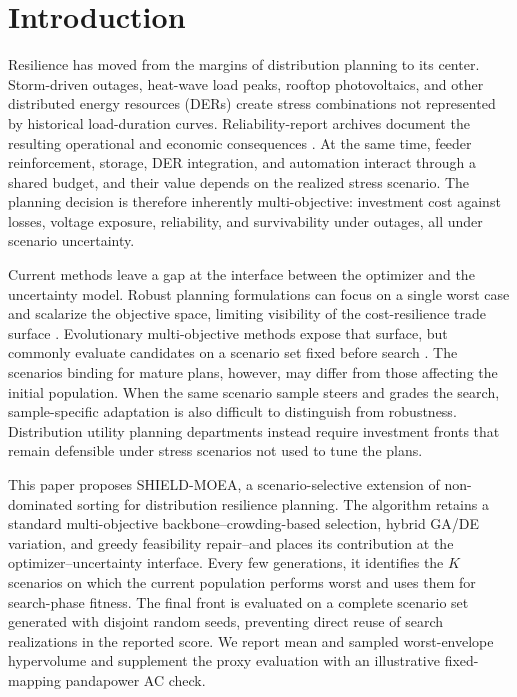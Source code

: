 \documentclass[energies,article,submit,moreauthors]{Definitions/mdpi}
\begin{document}
\section{Introduction}\label{introduction}

Resilience has moved from the margins of distribution planning to its center. Storm-driven outages, heat-wave load peaks, rooftop photovoltaics, and other distributed energy resources (DERs) create stress combinations not represented by historical load-duration curves. Reliability-report archives document the resulting operational and economic consequences \cite{ref1,ref2}. At the same time, feeder reinforcement, storage, DER integration, and automation interact through a shared budget, and their value depends on the realized stress scenario. The planning decision is therefore inherently multi-objective: investment cost against losses, voltage exposure, reliability, and survivability under outages, all under scenario uncertainty.

Current methods leave a gap at the interface between the optimizer and the uncertainty model. Robust planning formulations can focus on a single worst case and scalarize the objective space, limiting visibility of the cost-resilience trade surface \cite{ref3,ref4}. Evolutionary multi-objective methods expose that surface, but commonly evaluate candidates on a scenario set fixed before search \cite{ref5,ref6}. The scenarios binding for mature plans, however, may differ from those affecting the initial population. When the same scenario sample steers and grades the search, sample-specific adaptation is also difficult to distinguish from robustness. Distribution utility planning departments instead require investment fronts that remain defensible under stress scenarios not used to tune the plans.

This paper proposes SHIELD-MOEA, a scenario-selective extension of non-dominated sorting for distribution resilience planning. The algorithm retains a standard multi-objective backbone--crowding-based selection, hybrid GA/DE variation, and greedy feasibility repair--and places its contribution at the optimizer--uncertainty interface. Every few generations, it identifies the \(K\) scenarios on which the current population performs worst and uses them for search-phase fitness. The final front is evaluated on a complete scenario set generated with disjoint random seeds, preventing direct reuse of search realizations in the reported score. We report mean and sampled worst-envelope hypervolume and supplement the proxy evaluation with an illustrative fixed-mapping pandapower AC check.
\end{document}
